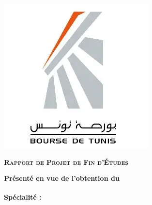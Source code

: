 \hfill
\begin{minipage}[l]{0.02\columnwidth}
\end{minipage}
\hfill
\begin{minipage}[l]{0.2\columnwidth}
\vspace{6mm}
\includegraphics[width=1.3\columnwidth]{img/bvmt logo.png}\\
\end{minipage}
\vskip1.5cm

\begin{center}
{\LARGE{\textbf{\textsc{Rapport de Projet de Fin d'Études}}}}\\
\vskip0.5cm
\large

{\textbf{Présenté en vue de l'obtention du}}\\
\vskip2mm
{\textbf{\@diplomaName}}\\
{\textbf{Spécialité : \@speciality}}\\
{}
\end{center}

